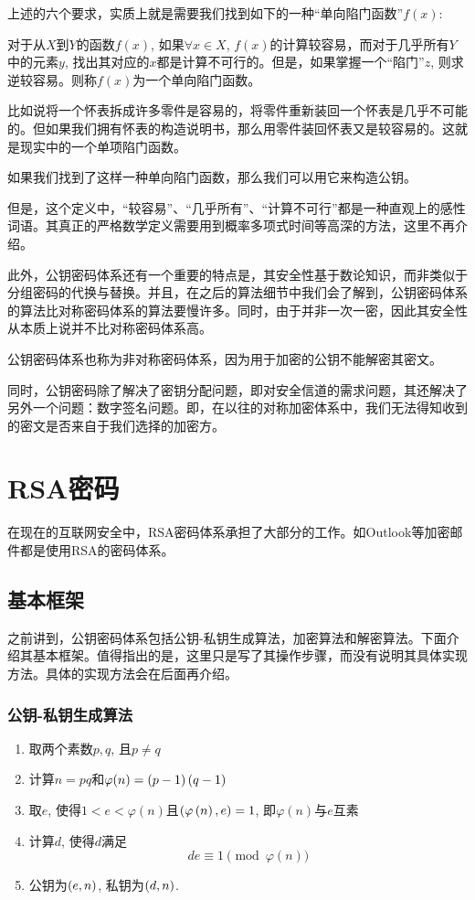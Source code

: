 上述的六个要求，实质上就是需要我们找到如下的一种“单向陷门函数”$f(x)$:\par
对于从$X$到$Y$的函数$f(x)$, 如果$\forall x\in X$, $f(x)$的计算较容易，而对于几乎所有$Y$中的元素$y$, 找出其对应的$x$都是计算不可行的。但是，如果掌握一个“陷门”$z$, 则求逆较容易。则称$f(x)$为一个单向陷门函数。\par
比如说将一个怀表拆成许多零件是容易的，将零件重新装回一个怀表是几乎不可能的。但如果我们拥有怀表的构造说明书，那么用零件装回怀表又是较容易的。这就是现实中的一个单项陷门函数。\par
如果我们找到了这样一种单向陷门函数，那么我们可以用它来构造公钥。\par
但是，这个定义中，“较容易”、“几乎所有”、“计算不可行”都是一种直观上的感性词语。其真正的严格数学定义需要用到概率多项式时间等高深的方法，这里不再介绍。\par
此外，公钥密码体系还有一个重要的特点是，其安全性基于数论知识，而非类似于分组密码的代换与替换。并且，在之后的算法细节中我们会了解到，公钥密码体系的算法比对称密码体系的算法要慢许多。同时，由于并非一次一密，因此其安全性从本质上说并不比对称密码体系高。\par
公钥密码体系也称为非对称密码体系，因为用于加密的公钥不能解密其密文。\par
同时，公钥密码除了解决了密钥分配问题，即对安全信道的需求问题，其还解决了另外一个问题：数字签名问题。即，在以往的对称加密体系中，我们无法得知收到的密文是否来自于我们选择的加密方。
\section{RSA密码}
在现在的互联网安全中，RSA密码体系承担了大部分的工作。如Outlook等加密邮件都是使用RSA的密码体系。
\subsection{基本框架}
之前讲到，公钥密码体系包括公钥-私钥生成算法，加密算法和解密算法。下面介绍其基本框架。值得指出的是，这里只是写了其操作步骤，而没有说明其具体实现方法。具体的实现方法会在后面再介绍。
\subsubsection{公钥-私钥生成算法}
\begin{enumerate}
\item 取两个素数$p, q$, 且$p\neq q$
\item 计算$n=pq$和$\varphi(n)=\left( {p-1}\right)\left( {q-1}\right)$
\item 取$e$, 使得$1<e<\varphi(n)$且$\left( {\varphi\left( {n}\right), e}\right)=1$, 即$\varphi(n)$与$e$互素
\item 计算$d$, 使得$d$满足
\begin{equation}
de\equiv 1\pmod{\varphi(n)}
\end{equation}
\item 公钥为$\left( {e, n}\right)$, 私钥为$\left( {d, n}\right)$.
\end{enumerate}
